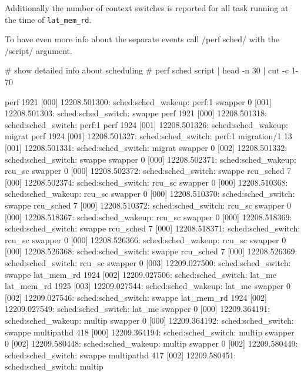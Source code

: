 \stoptyping

Additionally the number of context switches is reported for all task
running at the time of {\tt lat_mem_rd}.

To have even more info about the separate events call /perf sched/ with the /script/ argument.

\starttyping
# show detailed info about scheduling
# perf sched script | head -n 30 | cut -c 1-70

            perf  1921 [000] 12208.501300:  sched:sched_wakeup: perf:1
         swapper     0 [001] 12208.501303:  sched:sched_switch: swappe
            perf  1921 [000] 12208.501318:  sched:sched_switch: perf:1
            perf  1924 [001] 12208.501326:  sched:sched_wakeup: migrat
            perf  1924 [001] 12208.501327:  sched:sched_switch: perf:1
     migration/1    13 [001] 12208.501331:  sched:sched_switch: migrat
         swapper     0 [002] 12208.501332:  sched:sched_switch: swappe
         swapper     0 [000] 12208.502371:  sched:sched_wakeup: rcu_sc
         swapper     0 [000] 12208.502372:  sched:sched_switch: swappe
       rcu_sched     7 [000] 12208.502374:  sched:sched_switch: rcu_sc
         swapper     0 [000] 12208.510368:  sched:sched_wakeup: rcu_sc
         swapper     0 [000] 12208.510370:  sched:sched_switch: swappe
       rcu_sched     7 [000] 12208.510372:  sched:sched_switch: rcu_sc
         swapper     0 [000] 12208.518367:  sched:sched_wakeup: rcu_sc
         swapper     0 [000] 12208.518369:  sched:sched_switch: swappe
       rcu_sched     7 [000] 12208.518371:  sched:sched_switch: rcu_sc
         swapper     0 [000] 12208.526366:  sched:sched_wakeup: rcu_sc
         swapper     0 [000] 12208.526368:  sched:sched_switch: swappe
       rcu_sched     7 [000] 12208.526369:  sched:sched_switch: rcu_sc
         swapper     0 [003] 12209.027500:  sched:sched_switch: swappe
      lat_mem_rd  1924 [002] 12209.027506:  sched:sched_switch: lat_me
      lat_mem_rd  1925 [003] 12209.027544:  sched:sched_wakeup: lat_me
         swapper     0 [002] 12209.027546:  sched:sched_switch: swappe
      lat_mem_rd  1924 [002] 12209.027549:  sched:sched_switch: lat_me
         swapper     0 [000] 12209.364191:  sched:sched_wakeup: multip
         swapper     0 [000] 12209.364192:  sched:sched_switch: swappe
      multipathd   418 [000] 12209.364194:  sched:sched_switch: multip
         swapper     0 [002] 12209.580448:  sched:sched_wakeup: multip
         swapper     0 [002] 12209.580449:  sched:sched_switch: swappe
      multipathd   417 [002] 12209.580451:  sched:sched_switch: multip
\stoptyping

